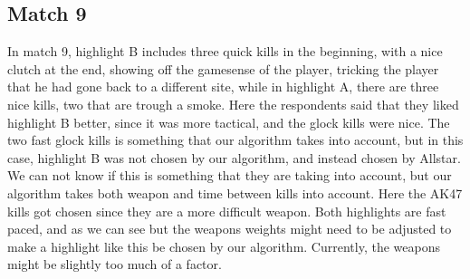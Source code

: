 \subsection{Match 9}
In match 9, highlight B includes three quick kills in the beginning, with a nice clutch at the end, showing off the gamesense of the player, tricking the player that he had gone back to a different site, while in highlight A, there are three nice kills, two that are trough a smoke. Here the respondents said that they liked highlight B better, since it was more tactical, and the glock kills were nice. The two fast glock kills is something that our algorithm takes into account, but in this case, highlight B was not chosen by our algorithm, and instead chosen by Allstar. We can not know if this is something that they are taking into account, but our algorithm takes both weapon and time between kills into account. Here the AK47 kills got chosen since they are a more difficult weapon. Both highlights are fast paced, and as we can see but the weapons weights might need to be adjusted to make a highlight like this be chosen by our algorithm. Currently, the weapons might be slightly too much of a factor. 





